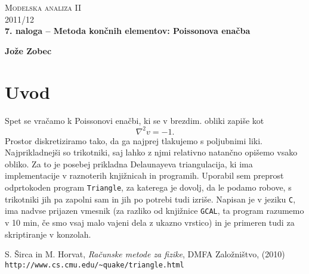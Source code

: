 \documentclass[a4 paper, 12pt]{article}
\begin{document}
\begin{center}
\textsc{Modelska analiza II}\\
\textsc{2011/12}\\[0.5cm]
\textbf{7. naloga -- Metoda kon\v cnih elementov: Poissonova ena\v cba}
\end{center}
\begin{flushright}
\textbf{Jože Zobec}\\
\end{flushright}

\section{Uvod}

Spet se vra\v camo k Poissonovi ena\v cbi, ki se v brezdim. obliki zapi\v se kot
\begin{equation}
	\nabla^2 v = -1.
\end{equation}
Prostor diskretiziramo tako, da ga najprej tlakujemo s poljubnimi liki. Najprikladnej\v si so
trikotniki, saj lahko z njmi relativno natan\v cno opi\v semo vsako obliko.
Za to je posebej prikladna Delaunayeva triangulacija, ki ima implementacije v raznoterih
knji\v znicah in programih. Uporabil sem preprost odprtokoden program \texttt{Triangle},
za katerega je dovolj, da le podamo robove, s trikotniki jih pa zapolni sam in jih po potrebi
tudi izri\v se. Napisan je v jeziku {\tt C}, ima nadvse prijazen vmesnik (za razliko od knji\v znice
{\tt GCAL}, ta program razumemo v 10 min, \v ce smo vsaj malo vajeni dela z ukazno vrstico)
in je primeren tudi za skriptiranje v konzolah.

\begin{thebibliography}{9}
		S. \v Sirca in M. Horvat,
		{\em Ra\v cunske metode za fizike},
		DMFA Zalo\v zni\v stvo,
		(2010)
		{\tt http://www.cs.cmu.edu/\~{}quake/triangle.html}
\end{thebibliography}
\end{document}
